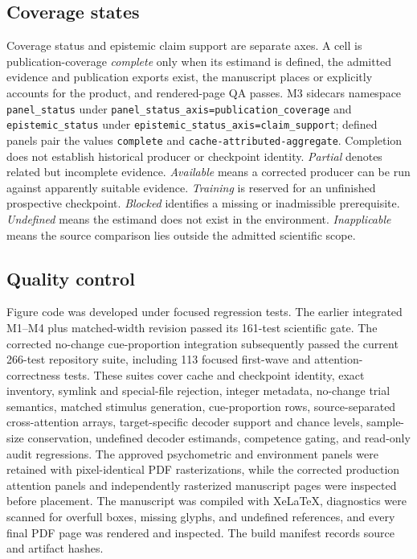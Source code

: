 \documentclass[11pt,a4paper]{article}
\begin{document}
\subsection{Coverage states}
Coverage status and epistemic claim support are separate axes. A cell is publication-coverage \emph{complete} only when its estimand is defined, the admitted evidence and publication exports exist, the manuscript places or explicitly accounts for the product, and rendered-page QA passes. M3 sidecars namespace \texttt{panel\_status} under \texttt{panel\_status\_axis=publication\_coverage} and \texttt{epistemic\_status} under \texttt{epistemic\_status\_axis=claim\_support}; defined panels pair the values \texttt{complete} and \texttt{cache-attributed-aggregate}. Completion does not establish historical producer or checkpoint identity. \emph{Partial} denotes related but incomplete evidence. \emph{Available} means a corrected producer can be run against apparently suitable evidence. \emph{Training} is reserved for an unfinished prospective checkpoint. \emph{Blocked} identifies a missing or inadmissible prerequisite. \emph{Undefined} means the estimand does not exist in the environment. \emph{Inapplicable} means the source comparison lies outside the admitted scientific scope.

\subsection{Quality control}
Figure code was developed under focused regression tests. The earlier integrated M1--M4 plus matched-width revision passed its 161-test scientific gate. The corrected no-change cue-proportion integration subsequently passed the current 266-test repository suite, including 113 focused first-wave and attention-correctness tests. These suites cover cache and checkpoint identity, exact inventory, symlink and special-file rejection, integer metadata, no-change trial semantics, matched stimulus generation, cue-proportion rows, source-separated cross-attention arrays, target-specific decoder support and chance levels, sample-size conservation, undefined decoder estimands, competence gating, and read-only audit regressions. The approved psychometric and environment panels were retained with pixel-identical PDF rasterizations, while the corrected production attention panels and independently rasterized manuscript pages were inspected before placement. The manuscript was compiled with XeLaTeX, diagnostics were scanned for overfull boxes, missing glyphs, and undefined references, and every final PDF page was rendered and inspected. The build manifest records source and artifact hashes.
\end{document}
